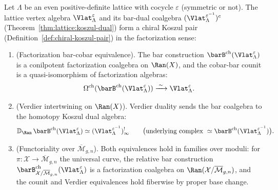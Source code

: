 \begin{theorem}
\label{thm:lattice:factorization-koszul}
Let $\Lambda$ be an even positive-definite lattice with cocycle
$\varepsilon$ \textup{(}symmetric or not\textup{)}. The lattice
vertex algebra $\Vlat_\Lambda^\varepsilon$ and its bar-dual coalgebra
$(\Vlat_\Lambda^{\varepsilon^{-1}})^c$
\textup{(}Theorem~\textup{\ref{thm:lattice:koszul-dual})} form a
chiral Koszul pair
\textup{(}Definition~\textup{\ref{def:chiral-koszul-pair})} in
the factorization sense:
\begin{enumerate}[label=(\roman*)]
\item \textup{(}Factorization bar-cobar equivalence\textup{).}
 The bar construction
 $\barB^{\mathrm{ch}}(\Vlat_\Lambda^\varepsilon)$ is a conilpotent
 factorization coalgebra on $\Ran(X)$, and the cobar-bar counit
 is a quasi-isomorphism of factorization algebras:
 \begin{equation}\label{eq:lattice:fact-bar-cobar}
 \Omega^{\mathrm{ch}}(\barB^{\mathrm{ch}}(\Vlat_\Lambda^\varepsilon))
 \xrightarrow{\;\sim\;}
 \Vlat_\Lambda^\varepsilon.
 \end{equation}
\item \textup{(}Verdier intertwining on $\Ran(X)$\textup{).}
 Verdier duality sends the bar coalgebra to the homotopy Koszul
 dual algebra:
 \begin{equation}\label{eq:lattice:verdier-ran}
 \mathbb{D}_{\Ran}\, \barB^{\mathrm{ch}}(\Vlat_\Lambda^\varepsilon)
 \simeq
 (\Vlat_\Lambda^{\varepsilon^{-1}})^!_\infty
 \qquad
 \bigl(\text{underlying complex }
 \simeq \barB^{\mathrm{ch}}(\Vlat_\Lambda^{\varepsilon^{-1}})\bigr).
 \end{equation}
\item \textup{(}Functoriality over $\overline{\mathcal{M}}_{g,n}$\textup{).}
 Both equivalences hold in families over moduli: for
 $\pi\colon \mathcal{X} \to \overline{\mathcal{M}}_{g,n}$ the universal curve,
 the relative bar construction
 $\barB^{\mathrm{ch}}_{\mathcal{X}/\overline{\mathcal{M}}_{g,n}}
 (\Vlat_\Lambda^\varepsilon)$ is a factorization coalgebra on
 $\Ran(\mathcal{X}/\overline{\mathcal{M}}_{g,n})$, and the counit and Verdier
 equivalences hold fiberwise by proper base change.
\end{enumerate}
\end{theorem}

